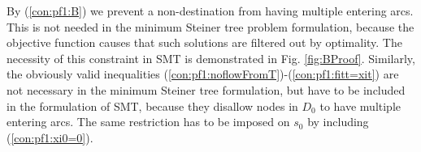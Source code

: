 By (\ref{con:pf1:B}) we prevent a non-destination from having multiple entering arcs.
This is not needed in the minimum Steiner tree problem formulation, because the objective function causes that such solutions are filtered out by optimality.
The necessity of this constraint in SMT is demonstrated in Fig. \ref{fig:BProof}.
Similarly, the obviously valid inequalities (\ref{con:pf1:noflowFromT})-(\ref{con:pf1:fitt=xit}) are not necessary in the minimum Steiner tree formulation, but have to be included in the formulation of SMT, because they  disallow nodes in $D_0$ to have multiple entering arcs.
The same restriction has to be imposed on $s_0$ by including (\ref{con:pf1:xi0=0}).
